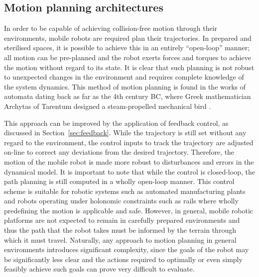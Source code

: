 \subsection{Motion planning architectures}
In order to be capable of achieving collision-free motion through their environments, mobile robots are required plan their trajectories. In prepared and sterilised spaces, it is possible to achieve this in an entirely ``open-loop'' manner; all motion can be pre-planned and the robot exerts forces and torques to achieve the motion without regard to its state. It is clear that such planning is not robust to unexpected changes in the environment and requires complete knowledge of the system dynamics. This method of motion planning is found in the works of automata dating back as far as the 4th century BC, where Greek mathematician Archytas of Tarentum designed a steam-propelled mechanical bird \cite{winter2007corpus}.

This approach can be improved by the application of feedback control, as discussed in Section~\ref{sec:feedback}. While the trajectory is still set without any regard to the environment, the control inputs to track the trajectory are adjusted on-line to correct any deviations from the desired trajectory. Therefore, the motion of the mobile robot is made more robust to disturbances and errors in the dynamical model. It is important to note that while the control is closed-loop, the path planning is still computed in a wholly open-loop manner. This control scheme is suitable for robotic systems such as automated manufacturing plants and robots operating under holonomic constraints such as rails where wholly predefining the motion is applicable and safe. However, in general, mobile robotic platforms are not expected to remain in carefully prepared environments and thus the path that the robot takes must be informed by the terrain through which it must travel. Naturally, any approach to motion planning in general environments introduces significant complexity, since the goals of the robot may be significantly less clear and the actions required to optimally or even simply feasibly achieve such goals can prove very difficult to evaluate.

